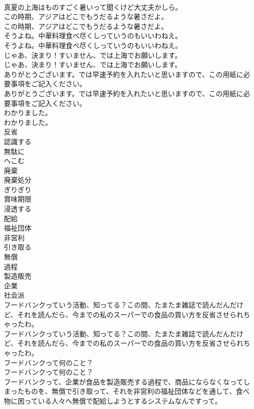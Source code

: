 \documentclass[8pt]{extreport}
\begin{document}
\begin{CJK}{UTF8}{min}
\\	真夏の上海はものすごく暑いって聞くけど大丈夫かしら。 
\\	この時期、アジアはどこでもうだるような暑さだよ。	
\\	この時期、アジアはどこでもうだるような暑さだよ。 
\\	そうよね。中華料理食べ尽くしっていうのもいいわねえ。	
\\	そうよね。中華料理食べ尽くしっていうのもいいわねえ。 
\\	じゃあ、決まり！すいません、では上海でお願いします。	
\\	じゃあ、決まり！すいません、では上海でお願いします。 
\\	ありがとうございます。では早速予約を入れたいと思いますので、この用紙に必要事項をご記入ください。	
\\	ありがとうございます。では早速予約を入れたいと思いますので、この用紙に必要事項をご記入ください。 
\\	わかりました。	
\\	わかりました。 
\\	反省
\\	認識する
\\	無駄に
\\	へこむ
\\	廃棄
\\	廃棄処分
\\	ぎりぎり
\\	賞味期限
\\	浸透する
\\	配給
\\	福祉団体
\\	非営利
\\	引き取る
\\	無償
\\	過程
\\	製造販売
\\	企業
\\	社会派
\\	フードバンクっていう活動、知ってる？この間、たまたま雑誌で読んだんだけど、それを読んだら、今までの私のスーパーでの食品の買い方を反省させられちゃったわ。	
\\	フードバンクっていう活動、知ってる？この間、たまたま雑誌で読んだんだけど、それを読んだら、今までの私のスーパーでの食品の買い方を反省させられちゃったわ。 
\\	フードバンクって何のこと？	
\\	フードバンクって何のこと？ 
\\	フードバンクって、企業が食品を製造販売する過程で、商品にならなくなってしまったものを、無償で引き取って、それを非営利の福祉団体などを通して、食べ物に困っている人々へ無償で配給しようとするシステムなんですって。	

\end{CJK}
\end{document}
